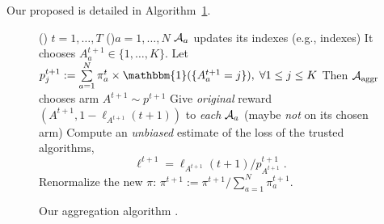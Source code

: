 Our proposed \Aggr{} is detailed in Algorithm~\ref{algo:25:Aggr}.
%
\begin{small}
	\begin{figure}[h!]
		\centering
		\begin{framed}
		\begin{algorithm}[H]
			\For()
            {$t = 1, \dots, T$}{
				\For(){$a = 1, \dots, N$}{
					$\Alg_a$ updates its indexes (e.g., \UCB{} indexes)\;
					It chooses $A^{t+1}_{a} \in \{1, \dots, K\}$.
				}
				Let $p^{t+1}_j := \sum\limits_{a = 1}^{N} \pi^{t}_a \times \mathbbm{1}(\{A^{t+1}_{a} = j\}), \;\forall 1\leq j \leq K$\;
				Then $\mathcal{A}_{\mathrm{aggr}}$ chooses arm $A^{t+1} \sim p^{t+1}$\;
				Give \emph{original} reward $(A^{t+1}, 1 - \ell_{A^{t+1}}(t+1))$ to \emph{each} $\Alg_a$ (maybe \emph{not} on its chosen arm)\;
				Compute an \emph{unbiased} estimate of the loss of the trusted algorithms,$$ \ell^{t+1} = \ell_{A^{t+1}}(t+1) / p^{t+1}_{A^{t+1}}\;. $$
				\For{$a = 1, \dots, N$}{
					\If{$\Alg_a$ was trusted, \ie, $A^{t+1}_{a} = A^{t+1}$}{
						$ \pi^{t+1}_{a} = \exp(\eta_t \ell^{t+1}) \times \pi^{t}_{a} $
						}%
				}
				Renormalize the new $\pi$: $\pi^{t+1} := \pi^{t+1} / \sum_{a=1}^{N} \pi^{t+1}_{a}$.
			}
			\caption{Our aggregation algorithm \Aggr.}
			\label{algo:25:Aggr}
		\end{algorithm}
		\end{framed}
	\end{figure}
\end{small}


